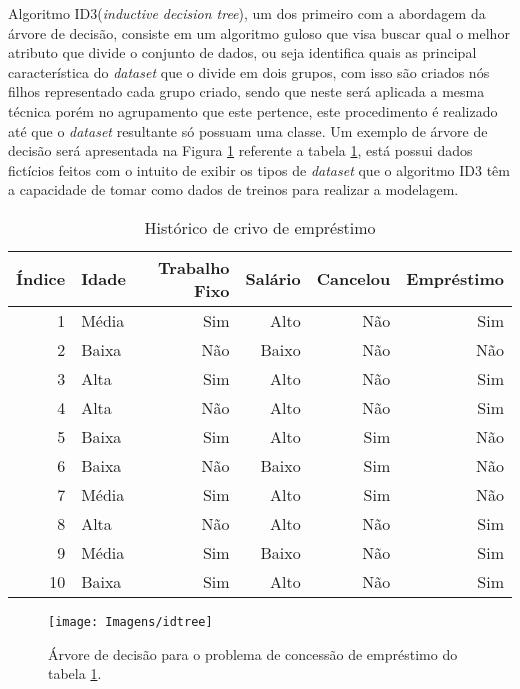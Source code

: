 \documentclass[
12pt,				%
oneside,			%
a4paper,			%
english,			%
french,				%
spanish,			%
brazil				%
]{abntex2}
\begin{document}
Algoritmo ID3(\textit{inductive decision tree})\cite{quinlan1986induction}, um dos primeiro com a abordagem da árvore de decisão, consiste em um algoritmo guloso  que visa buscar qual o melhor atributo que divide o conjunto de dados, ou seja identifica quais as principal característica do \textit{dataset} que o divide em dois grupos, com isso são criados nós filhos representado cada grupo criado, sendo que neste será aplicada a mesma técnica porém no agrupamento que este pertence, este procedimento é realizado até que o \textit{dataset} resultante só possuam uma classe. Um exemplo de árvore de decisão será apresentada na Figura \ref{figura:idtree} referente a tabela \ref{tab:crivo_emprestimo}, está possui dados fictícios feitos com o intuito de exibir os tipos de \textit{dataset} que o algoritmo ID3 têm a capacidade de tomar como dados de treinos para realizar a modelagem. 


\begin{table}[h]
	\centering
	\caption{Histórico de crivo de empréstimo}
	\begin{tabular}{r|lrrrr}
		
		Índice & Idade & Trabalho Fixo & Salário & Cancelou & Empréstimo \\ %
		\hline                               %
		1 & Média & Sim & Alto & Não & Sim \\
		2 & Baixa & Não & Baixo & Não & Não \\
		3 & Alta & Sim & Alto & Não & Sim \\
		4 & Alta & Não & Alto & Não & Sim \\	
		5 & Baixa & Sim & Alto & Sim & Não \\
		6 & Baixa & Não & Baixo & Sim & Não \\
		7 & Média & Sim & Alto & Sim & Não \\
		8 & Alta & Não & Alto & Não & Sim \\				
		9 & Média & Sim & Baixo & Não & Sim \\
		10 & Baixa & Sim & Alto & Não & Sim \\
	\end{tabular}
	\label{tab:crivo_emprestimo}
\end{table}

\begin{figure}[H]
	\centering 
	\texttt{[image: Imagens/idtree]} 
	\caption{Árvore de decisão para o problema de concessão de empréstimo do tabela \ref{tab:crivo_emprestimo}.}
	\label{figura:idtree}
\end{figure}
\end{document}
